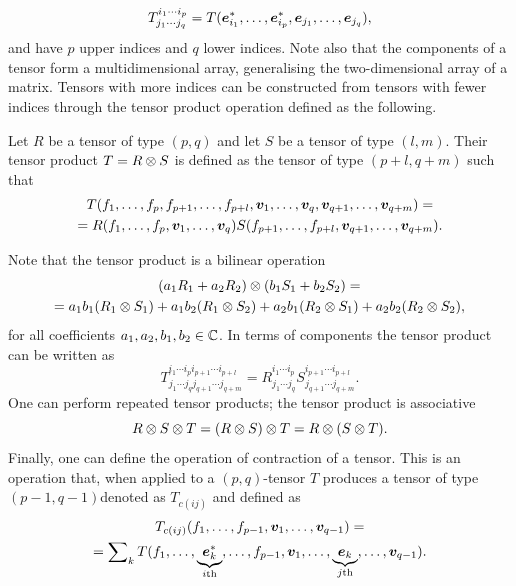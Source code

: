 \begin{equation}
    T^{i_1\cdots i_p}_{j_1\cdots j_q} = T(\bm{e}_{i_1}^*,\dots,\bm{e}_{i_p}^*,\bm{e}_{j_1},\dots,\bm{e}_{j_q}),
\end{equation}
and have $p$ upper indices and $q$ lower indices. Note also that the components of a tensor form a multidimensional array, generalising the two-dimensional array of a matrix. Tensors with more indices can be constructed from tensors with fewer indices through the tensor product operation defined as the following.
\begin{defn}
    Let $R$ be a tensor of type $(p,q)$ and let $S$ be a tensor of type $(l,m)$. Their tensor product $T = R \otimes S$ is defined as the tensor of type $(p + l, q + m)$ such that 
    \begin{multline}
    \label{eq: tensor product of tensors}
        T(f_1,\dots,f_p,f_{p + 1},\dots,f_{p + l},\bm{v}_1,\dots,\bm{v}_q,\bm{v}_{q + 1},\dots,\bm{v}_{q+m}) = \\
        =R(f_1,\dots,f_p,\bm{v}_1,\dots,\bm{v}_q)S(f_{p + 1},\dots,f_{p + l},\bm{v}_{q + 1},\dots,\bm{v}_{q+m}).
    \end{multline}
\end{defn}
Note that the tensor product is a bilinear operation 
\begin{multline}
    (a_1R_1 + a_2R_2) \otimes (b_1S_1 + b_2S_2) = \\
    = a_1b_1(R_1 \otimes S_1) + a_1b_2(R_1 \otimes S_2) + a_2b_1(R_2 \otimes S_1) + a_2b_2(R_2 \otimes S_2),
\end{multline}
for all coefficients $a_1,a_2,b_1,b_2 \in \mathbb{C}$. In terms of components the tensor product can be written as
\begin{equation}
\label{eq: tensor product of tensors in terms of components}
    T^{i_1\cdots i_pi_{p + 1}\cdots i_{p + l}}_{j_1\cdots j_qj_{q+1}\cdots j_{q+m}} = R^{i_1\cdots i_p}_{j_1\cdots j_q}S^{i_{p + 1}\cdots i_{p + l}}_{j_{q + 1}\cdots j_{q + m}}.
\end{equation}
One can perform repeated tensor products; the tensor product is associative 
\begin{equation}
    R \otimes S \otimes T = (R \otimes S) \otimes T = R \otimes (S \otimes T).
\end{equation}
Finally, one can define the operation of contraction of a tensor. This is an operation that, when applied to a $(p,q)$-tensor $T$ produces a tensor of type $(p - 1,q - 1)$denoted as $T_{c(ij)}$ and defined as
\begin{multline}
    T_{c(ij)}(f_1,\dots,f_{p - 1},\bm{v}_1,\dots,\bm{v}_{q - 1}) = \\ 
    = \sum\nolimits_{k}T(f_1,\dots,\underbrace{\bm{e}_k^*}_{i\mathrm{th}},\dots,f_{p - 1},\bm{v}_1,\dots,\underbrace{\bm{e}_k}_{j\mathrm{th}},\dots,\bm{v}_{q - 1}).
\end{multline}
